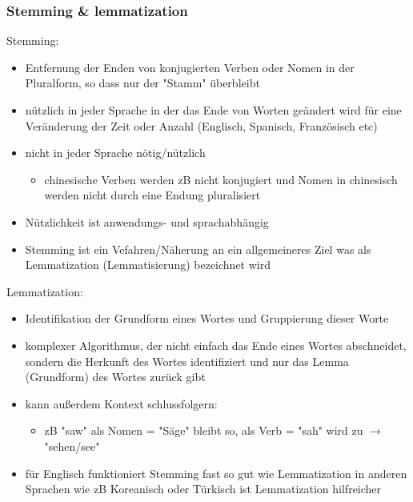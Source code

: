\documentclass[11pt]{article}
\begin{document}
\subsubsection{Stemming \& lemmatization}
\label{sec:orgadbecc3}
Stemming:
\begin{itemize}
\item Entfernung der Enden von konjugierten Verben oder Nomen in der Pluralform, so dass nur der "Stamm" überbleibt
\item nützlich in jeder Sprache in der das Ende von Worten geändert wird für eine Veränderung der Zeit oder Anzahl (Englisch, Spanisch, Französisch etc)
\item nicht in jeder Sprache nötig/nützlich
\begin{itemize}
\item chinesische Verben werden zB nicht konjugiert und Nomen in chinesisch werden nicht durch eine Endung pluralisiert
\end{itemize}
\item Nützlichkeit ist anwendungs- und sprachabhängig
\item Stemming ist ein Vefahren/Näherung an ein allgemeineres Ziel was als Lemmatization (Lemmatisierung) bezeichnet wird
\end{itemize}

Lemmatization:
\begin{itemize}
\item Identifikation der Grundform eines Wortes und Gruppierung dieser Worte
\item komplexer Algorithmus, der nicht einfach das Ende eines Wortes abschneidet, sondern die Herkunft des Wortes identifiziert und nur das Lemma (Grundform) des Wortes zurück gibt
\item kann außerdem Kontext schlussfolgern:
\begin{itemize}
\item zB "saw" als Nomen = "Säge" bleibt so, als Verb = "sah" wird zu \(\rightarrow\) "sehen/see"
\end{itemize}

\item für Englisch funktioniert Stemming fast so gut wie Lemmatization in anderen Sprachen wie zB Koreanisch oder Türkisch ist Lemmatization hilfreicher
\end{itemize}
\end{document}
